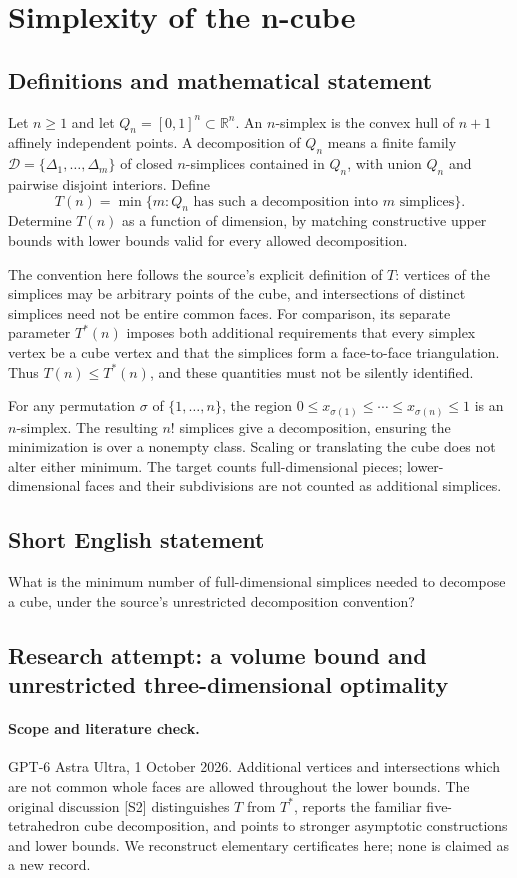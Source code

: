 \documentclass[11pt,a4paper]{article}
\begin{document}
\section*{Simplexity of the n-cube}\label{statement}

\subsection{Definitions and mathematical statement}
Let $n\ge1$ and let $Q_n=[0,1]^n\subset\mathbb R^n$.
An $n$-simplex is the convex hull of $n+1$ affinely independent points.
A decomposition of $Q_n$ means a finite family
$\mathcal D=\{\Delta_1,\ldots,\Delta_m\}$ of closed $n$-simplices
contained in $Q_n$, with union $Q_n$ and pairwise disjoint interiors.
Define
\[
 T(n)=\min\{m:Q_n\text{ has such a decomposition into }m\text{ simplices}\}.
\]
Determine $T(n)$ as a function of dimension, by matching constructive
upper bounds with lower bounds valid for every allowed decomposition.

The convention here follows the source's explicit definition of $T$:
vertices of the simplices may be arbitrary points of the cube, and
intersections of distinct simplices need not be entire common faces.
For comparison, its separate parameter $T^*(n)$ imposes both additional
requirements that every simplex vertex be a cube vertex and that the
simplices form a face-to-face triangulation. Thus $T(n)\le T^*(n)$, and
these quantities must not be silently identified.

For any permutation $\sigma$ of $\{1,\ldots,n\}$, the region
$0\le x_{\sigma(1)}\le\cdots\le x_{\sigma(n)}\le1$ is an $n$-simplex.
The resulting $n!$ simplices give a decomposition, ensuring the minimization
is over a nonempty class. Scaling or translating the cube does not
alter either minimum. The target counts full-dimensional pieces; lower-dimensional
faces and their subdivisions are not counted as additional simplices.
\subsection{Short English statement}
What is the minimum number of full-dimensional simplices needed to decompose a cube, under the source’s unrestricted decomposition convention?
\subsection{Research attempt: a volume bound and unrestricted three-dimensional optimality}
\paragraph{Scope and literature check.}
GPT-6 Astra Ultra, 1 October 2026. Additional vertices and intersections
which are not common whole faces are allowed throughout the lower
bounds. The original discussion [S2] distinguishes $T$ from $T^*$,
reports the familiar five-tetrahedron cube decomposition, and points to
stronger asymptotic constructions and lower bounds. We reconstruct
elementary certificates here; none is claimed as a new record.
\end{document}
